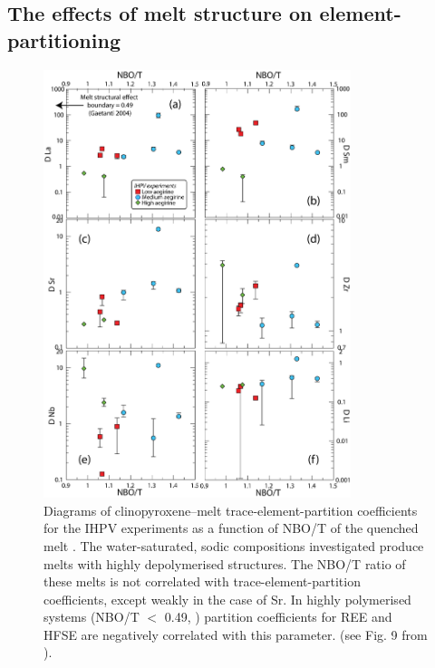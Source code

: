 \documentclass[final,authoryear,3p,times,twocolumn]{elsarticle}
\begin{document}

\subsection{The effects of melt structure on element-partitioning}


\begin{figure}[tp]
        \begin{center}
        \includegraphics[width=0.8\textwidth]{11_NBO-T_Traces.eps}
        \caption[]{Diagrams of clinopyroxene--melt trace-element-partition coefficients for the IHPV experiments as a function of NBO/T of the quenched melt \citep{Mysen1985}. The water-saturated, sodic compositions investigated produce melts with highly depolymerised structures. The NBO/T ratio of these melts is not correlated with trace-element-partition coefficients, except weakly in the case of Sr. In highly polymerised systems (NBO/T $<$ 0.49, \citealt{Gaetani2004}) partition coefficients for REE and HFSE are negatively correlated with this parameter. (see Fig. 9 from \citealt{Huang2006}).}
        \label{10_1_MeltStructure}
        \end{center}
        \end{figure}
\end{document}
